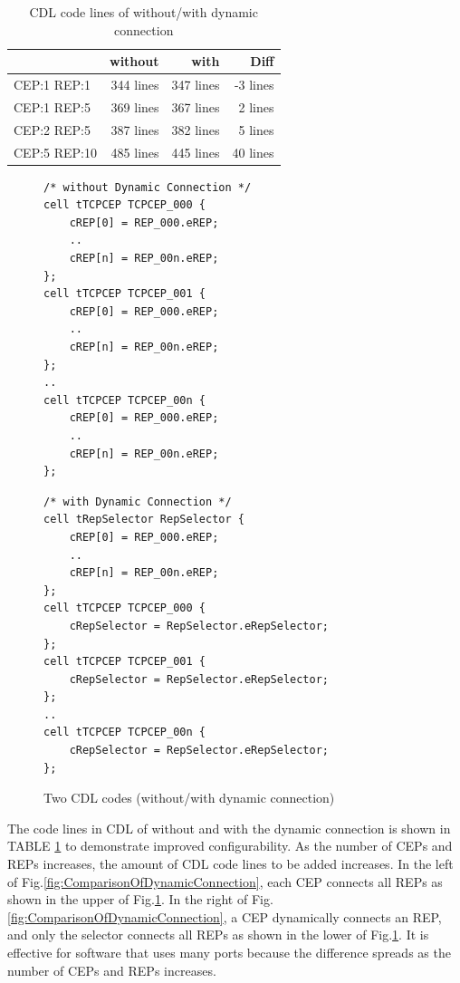 \documentclass[JIP]{ipsj_v2/UTF8/ipsj}
\begin{document}
\begin{table}[t]
    \centering
    \caption{CDL code lines of without/with dynamic connection}
    \begin{tabular}{l|r|r|r}
        \hline\hline
                     &  without  &  with  &  Diff  \\ \hline
        CEP:1 REP:1  &  344 lines     &  347 lines  &  -3 lines   \\
        CEP:1 REP:5  &  369 lines     &  367 lines  &   2 lines   \\
        CEP:2 REP:5  &  387 lines     &  382 lines  &   5 lines   \\
        CEP:5 REP:10 &  485 lines     &  445 lines  &  40 lines   \\
        \hline
    \end{tabular}
    \label{tab:EvaluationOfConfigurabilityByDynamicConnection}
\end{table}

\begin{figure}[t]
 \centering
 \begin{lstlisting}
/* without Dynamic Connection */
cell tTCPCEP TCPCEP_000 {
    cREP[0] = REP_000.eREP;
    ..
    cREP[n] = REP_00n.eREP;
};
cell tTCPCEP TCPCEP_001 {
    cREP[0] = REP_000.eREP;
    ..
    cREP[n] = REP_00n.eREP;
};
..
cell tTCPCEP TCPCEP_00n {
    cREP[0] = REP_000.eREP;
    ..
    cREP[n] = REP_00n.eREP;
};
 \end{lstlisting}
 \centering
 \begin{lstlisting}
/* with Dynamic Connection */
cell tRepSelector RepSelector {
    cREP[0] = REP_000.eREP;
    ..
    cREP[n] = REP_00n.eREP;
};
cell tTCPCEP TCPCEP_000 {
    cRepSelector = RepSelector.eRepSelector;
};
cell tTCPCEP TCPCEP_001 {
    cRepSelector = RepSelector.eRepSelector;
};
..
cell tTCPCEP TCPCEP_00n {
    cRepSelector = RepSelector.eRepSelector;
};
 \end{lstlisting}
 \caption{Two CDL codes (without/with dynamic connection)}
 \label{src:ComparisonOfCDL}
\end{figure}

The code lines in CDL of without and with the dynamic connection is shown in TABLE \ref{tab:EvaluationOfConfigurabilityByDynamicConnection} to demonstrate improved configurability.
As the number of CEPs and REPs increases, the amount of CDL code lines to be added increases.
In the left of Fig.\ref{fig:ComparisonOfDynamicConnection}, each CEP connects all REPs as shown in the upper of Fig.\ref{src:ComparisonOfCDL}. 
In the right of Fig.\ref{fig:ComparisonOfDynamicConnection}, a CEP dynamically connects an REP, and only the selector connects all REPs as shown in the lower of Fig.\ref{src:ComparisonOfCDL}. 
It is effective for software that uses many ports because the difference spreads as the number of CEPs and REPs increases.
\end{document}

